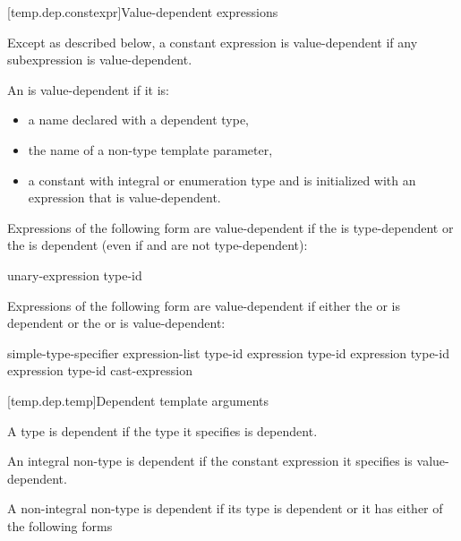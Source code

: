 [temp.dep.constexpr]{Value-dependent expressions}

\pnum
Except as described below, a constant expression is value-dependent if any
subexpression is value-dependent.

\pnum
An
is value-dependent if it is:

\begin{itemize}
\item
a name declared with a dependent type,
\item
the name of a non-type template parameter,
\item
a constant with integral or enumeration type and is initialized with an
expression that is value-dependent.
\end{itemize}

Expressions of the following form are value-dependent if the
is type-dependent or the
is dependent (even if   and
  \tcode{)} are not type-dependent):

\begin{ncbnftab}
 unary-expression\br
{} type-id \terminal{)}
\end{ncbnftab}

\pnum
Expressions of the following form are value-dependent if either the
or
is dependent or the
or
is value-dependent:

\begin{ncbnftab}
simple-type-specifier \terminal{(} expression-list\opt \terminal{)}\br
{} type-id \terminal{> (} expression \terminal{)}\br
{} type-id \terminal{> (} expression \terminal{)}\br
{} type-id \terminal{> (} expression \terminal{)}\br
\terminal{(} type-id \terminal{)} cast-expression
\end{ncbnftab}

[temp.dep.temp]{Dependent template arguments}

\pnum
A type
is dependent if the type it specifies is dependent.

\pnum
An integral non-type
is dependent if the constant expression it specifies is value-dependent.

\pnum
A non-integral non-type
is dependent if its type is dependent or it has either of the following
forms

